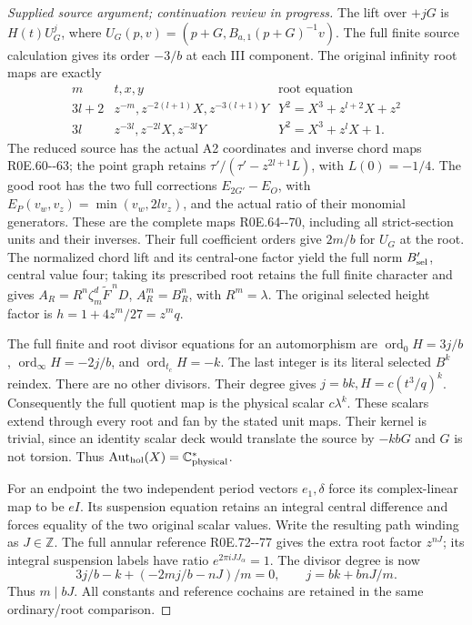 \begin{proof}[Supplied source argument; continuation review in progress]
The lift over \(+jG\) is \(H(t)U_G^j\), where
\(U_G(p,v)=(p+G,B_{a,1}(p+G)^{-1}v)\). The full finite source
calculation gives its order \(-3/b\) at each III component. The
original infinity root maps are exactly
\[
 \begin{array}{c|c|c}
 m&t,x,y&\text{root equation}\\\hline
 3l+2&z^{-m},z^{-2(l+1)}X,z^{-3(l+1)}Y
     &Y^2=X^3+z^{l+2}X+z^2\\
 3l&z^{-3l},z^{-2l}X,z^{-3l}Y
     &Y^2=X^3+z^lX+1.
 \end{array}                                                       \tag{R0R.16}
\]
The reduced source has the actual A2 coordinates and inverse chord
maps R0E.60-\/-63; the point graph retains
\(\tau'/(\tau'-z^{2l+1}L)\), with \(L(0)=-1/4\). The good root
has the two full corrections
\(E_{2G'}-E_O\), with \(E_P(v_w,v_z)=\min(v_w,2lv_z)\), and the
actual ratio of their monomial generators. These are the complete
maps R0E.64-\/-70, including all strict-section units and their inverses.
Their full coefficient orders give \(2m/b\) for \(U_G\) at the root.
The normalized chord lift and its central-one factor yield the full
norm \(B'_{\rm sel}\), central value four; taking its prescribed root
retains the full finite character and gives
\(A_R=R^n\zeta_m^d\widetilde F^{\,n}D\),
\(A_R^m=B_R^n\), with \(R^m=\lambda\). The original selected
height factor is \(h=1+4z^m/27=z^mq\).

The full finite and root divisor equations for an automorphism are
\(\operatorname{ord}_0H=3j/b\),
\(\operatorname{ord}_\infty H=-2j/b\), and
\(\operatorname{ord}_{t_c}H=-k\). The last integer is its literal
selected \(B^k\) reindex. There are no other divisors. Their degree
gives \(j=bk,H=c(t^3/q)^k\). Consequently the full quotient map is
the physical scalar \(c\lambda^k\). These scalars extend through
every root and fan by the stated unit maps. Their kernel is trivial,
since an identity scalar deck would translate the source by
\(-kbG\) and \(G\) is not torsion. Thus
\(\operatorname{Aut}_{\rm hol}(X)=\mathbb C^*_{\rm physical}\).

For an endpoint the two independent period vectors \(e_1,\delta\)
force its complex-linear map to be \(eI\). Its suspension equation
retains an integral central difference and forces equality of the
two original scalar values. Write the resulting path winding as
\(J\in\mathbb Z\). The full annular reference R0E.72-\/-77 gives
the extra root factor \(z^{nJ}\); its integral suspension labels
have ratio \(e^{2\pi iJ J_\alpha}=1\). The divisor degree is now
\[
 3j/b-k+(-2mj/b-nJ)/m=0,
 \qquad j=bk+bnJ/m.                              \tag{R0R.17}
\]
Thus \(m\mid bJ\). All constants and reference cochains are retained
in the same ordinary/root comparison.


\end{proof}
